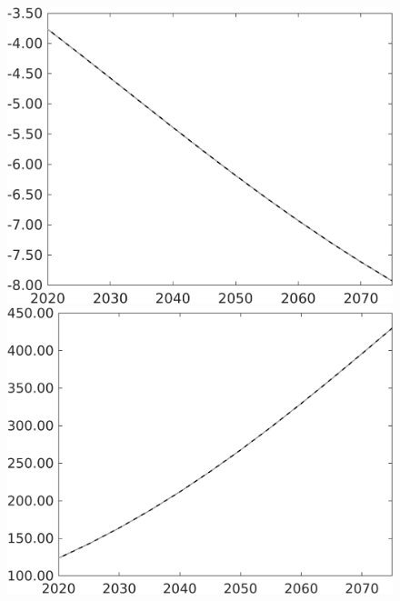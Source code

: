 \documentclass[12pt]{article}
\begin{document}
\begin{figure}[h!!]
\begin{minipage}[]{0.32\textwidth}
\end{minipage}	
\begin{minipage}[]{0.32\textwidth}
\includegraphics[width=1\textwidth]{../../codding_model/own_basedOnFried/optimalPol_010922_revision/figures/all_13Sept22/PerdifNoTauf_Equlab_regime0_CompTaul_EY_spillover0_nsk1_xgr1_knspil1_sep1_LFlimit0_emsbase0_countec0_GovRev0_etaa0.79_lgd0.png}
\end{minipage}	
\begin{minipage}[]{0.32\textwidth}
\includegraphics[width=1\textwidth]{../../codding_model/own_basedOnFried/optimalPol_010922_revision/figures/all_13Sept22/PerdifNoTauf_Equlab_regime0_CompTaul_pepn_spillover0_nsk1_xgr1_knspil1_sep1_LFlimit0_emsbase0_countec0_GovRev0_etaa0.79_lgd0.png}

\end{minipage}
\end{figure}
\end{document}
